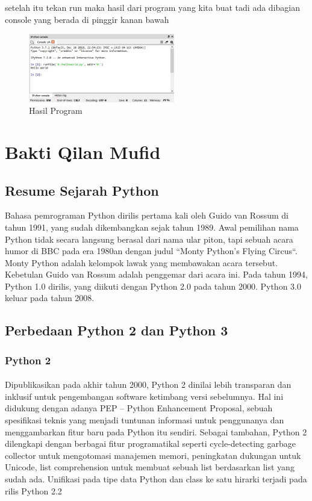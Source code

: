 setelah itu tekan run maka hasil dari program yang kita buat tadi ada dibagian console yang berada di pinggir kanan bawah

\begin{figure}[!htbp]
  \centering
  \includegraphics[height=3cm]{chapters/gambar/hasil.jpg}
  \caption{Hasil Program}
\end{figure}


\section{Bakti Qilan Mufid}
\subsection{Resume Sejarah Python}
\begin{flushleft}
\qquad Bahasa pemrograman Python dirilis pertama kali oleh Guido van Rossum di tahun 1991, yang sudah dikembangkan sejak tahun 1989. Awal pemilihan nama Python tidak secara langsung berasal dari nama ular piton, tapi sebuah acara humor di BBC pada era 1980an dengan judul “Monty Python’s Flying Circus“. Monty Python adalah kelompok lawak yang membawakan acara tersebut. Kebetulan Guido van Rossum adalah penggemar dari acara ini. Pada tahun 1994, Python 1.0 dirilis, yang diikuti dengan Python 2.0 pada tahun 2000. Python 3.0 keluar pada tahun 2008.
\end{flushleft}
\subsection{Perbedaan Python 2 dan Python 3}
\subsubsection{Python 2}
\paragraph{}
Dipublikasikan pada akhir tahun 2000, Python 2 dinilai lebih transparan dan inklusif untuk pengembangan software ketimbang versi sebelumnya. Hal ini didukung dengan adanya PEP – Python Enhancement Proposal, sebuah spesifikasi teknis yang menjadi tuntunan informasi untuk penggunanya dan menggambarkan fitur baru pada Python itu sendiri. Sebagai tambahan, Python 2 dilengkapi dengan berbagai fitur programatikal seperti cycle-detecting garbage collector untuk mengotomasi manajemen memori, peningkatan dukungan untuk Unicode, list comprehension untuk membuat sebuah list berdasarkan list yang sudah ada. Unifikasi pada tipe data Python dan class ke satu hirarki terjadi pada rilis Python 2.2
